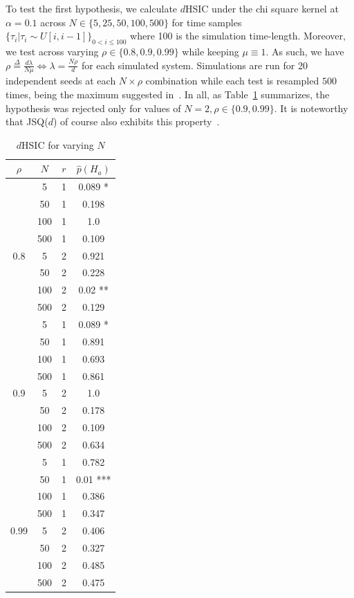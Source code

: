 To test the first hypothesis, we calculate $d$HSIC under the chi square kernel at $\alpha = 0.1$ across $N \in \{5, 25, 50, 100, 500\}$
for time samples $\{\tau_{i} | \tau_{i} \sim U[i,i-1]\}_{0 < i \leq 100}$ where 100 is the simulation time-length.
Moreover, we test across varying $\rho \in \{0.8, 0.9, 0.99\}$ while keeping $\mu \equiv 1$.
As such, we have $\rho \overset{\Delta}= \frac{d\lambda}{N\mu} \iff \lambda = \frac{N \rho}{d}$ for each simulated system.
Simulations are run for 20 independent seeds at each $N\times\rho$ combination while each test is resampled $500$ times, being the maximum suggested in~\cite{jointindep}.
In all, as Table~\ref{tab:reg} summarizes, the hypothesis was rejected only for values of $N = 2, \rho \in \{0.9,0.99\}$.
It is noteworthy that JSQ($d$) of course also exhibits this property~\cite{bramson_asymptotic_2012}.
\begin{table}
    \centering
    \caption{$d$HSIC for varying $N$}
    \label{tab:reg}
    \begin{tabular}{|c|c|c|c|}
        \hline
        $\rho$ & $N$ & $r$ & $\hat p(H_{a})$ \\
        \hline
        \hline
        & 5   & 1   & 0.089 *         \\
        & 50  & 1   & 0.198           \\
        & 100 & 1   & 1.0             \\
        & 500 & 1   & 0.109           \\
        0.8    & 5   & 2   & 0.921           \\
        & 50  & 2   & 0.228           \\
        & 100 & 2   & 0.02 **         \\
        & 500 & 2   & 0.129           \\
        \hline
        & 5   & 1   & 0.089 *         \\
        & 50  & 1   & 0.891           \\
        & 100 & 1   & 0.693           \\
        & 500 & 1   & 0.861           \\
        0.9    & 5   & 2   & 1.0             \\
        & 50  & 2   & 0.178           \\
        & 100 & 2   & 0.109           \\
        & 500 & 2   & 0.634           \\
        \hline

        & 5   & 1   & 0.782           \\
        & 50  & 1   & 0.01 ***        \\
        & 100 & 1   & 0.386           \\
        & 500 & 1   & 0.347           \\
        0.99   & 5   & 2   & 0.406           \\
        & 50  & 2   & 0.327           \\
        & 100 & 2   & 0.485           \\
        & 500 & 2   & 0.475           \\
        \hline



\end{tabular}
\end{table}
